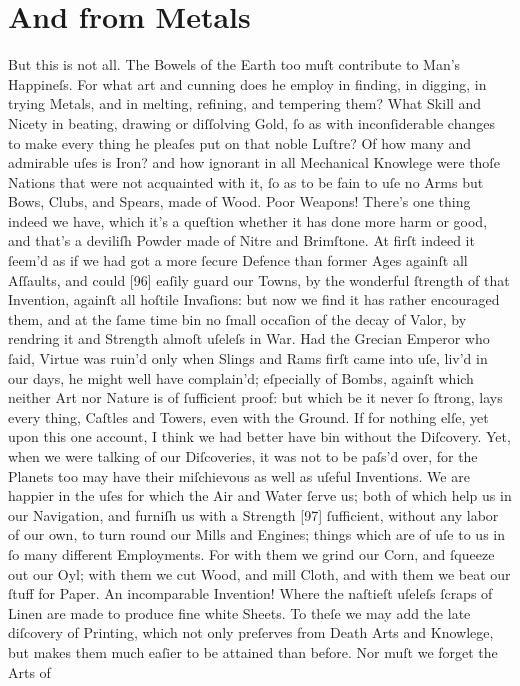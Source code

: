 \documentclass[letterpaper]{book}
\begin{document}
\section{And from Metals}

But this is not all. The Bowels of the Earth too muſt contribute to Man's
Happineſs. For what art and cunning does he employ in finding, in digging,
in trying Metals, and in melting, refining, and tempering them? What Skill
and Nicety in beating, drawing or diſſolving Gold, ſo as with inconſiderable changes to make every thing he pleaſes put on that noble Luſtre? Of how
many and admirable uſes is Iron? and how ignorant in all Mechanical
Knowlege were thoſe Nations that were not acquainted with it, ſo as to be
fain to uſe no Arms but Bows, Clubs, and Spears, made of Wood.  Poor
Weapons! There's one thing indeed we have, which it's a queſtion whether it
has done more harm or good, and that's a deviliſh Powder made of Nitre and
Brimſtone. At firſt indeed it ſeem'd as if we had got a more ſecure Defence
than former Ages againſt all Aſſaults, and could [96] eaſily guard our
Towns, by the wonderful ſtrength of that Invention, againſt all hoſtile
Invaſions: but now we find it has rather encouraged them, and at the ſame
time bin no ſmall occaſion of the decay of Valor, by rendring it and
Strength almoſt uſeleſs in War. Had the Grecian Emperor who ſaid, Virtue was
ruin'd only when Slings and Rams firſt came into uſe, liv'd in our days, he
might well have complain'd; eſpecially of Bombs, againſt which neither Art
nor Nature is of ſufficient proof: but which be it never ſo ſtrong, lays
every thing, Caſtles and Towers, even with the Ground. If for nothing elſe,
yet upon this one account, I think we had better have bin without the
Diſcovery. Yet, when we were talking of our Diſcoveries, it was not to be
paſs'd over, for the Planets too may have their miſchievous as well as
uſeful Inventions.  We are happier in the uſes for which the Air and Water
ſerve us; both of which help us in our Navigation, and furniſh us with a
Strength [97] ſufficient, without any labor of our own, to turn round our
Mills and Engines; things which are of uſe to us in ſo many different
Employments. For with them we grind our Corn, and ſqueeze out our Oyl; with
them we cut Wood, and mill Cloth, and with them we beat our ſtuff for Paper.
An incomparable Invention! Where the naſtieſt uſeleſs ſcraps of Linen are
made to produce fine white Sheets. To theſe we may add the late diſcovery of
Printing, which not only preſerves from Death Arts and Knowlege, but makes
them much eaſier to be attained than before. Nor muſt we forget the Arts of
\end{document}
